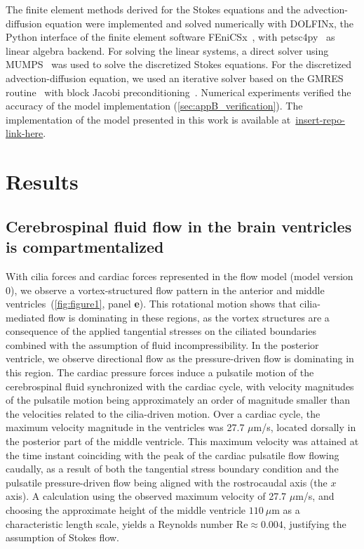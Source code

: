 \documentclass[fleqn]{wlscirep}
\begin{document}
The finite element methods derived for the Stokes equations and the advection-diffusion equation were implemented and solved numerically with DOLFINx, the Python interface of the finite element software FEniCSx~\cite{TheFEniCSProject2024FEniCSxDocumentation}, with petsc4py~\cite{Dalcin2011ParallelPython} as linear algebra backend. For solving the linear systems, a direct solver using MUMPS~\cite{Amestoy2011Mumps} was used to solve the discretized Stokes equations. For the discretized advection-diffusion equation, we used an iterative solver based on the GMRES routine~\cite{Saad1986GMRES:Systems} with block Jacobi preconditioning~\cite{Jacobi1845UeberGleichungen}. Numerical experiments verified the accuracy of the model implementation (\cref{sec:appB_verification}). The implementation of the model presented in this work is available at~\url{insert-repo-link-here}. 


\section*{Results}\label{sec:results}
\subsection*{Cerebrospinal fluid flow in the brain ventricles is compartmentalized}
With cilia forces and cardiac forces represented in the flow model (model version 0), we observe a vortex-structured flow pattern in the anterior and middle ventricles~(\cref{fig:figure1}, panel \textbf{e}). This rotational motion shows that cilia-mediated flow is dominating in these regions, as the vortex structures are a consequence of the applied tangential stresses on the ciliated boundaries combined with the assumption of fluid incompressibility. In the posterior ventricle, we observe directional flow as the pressure-driven flow is dominating in this region. The cardiac pressure forces induce a pulsatile motion of the cerebrospinal fluid synchronized with the cardiac cycle, with velocity magnitudes of the pulsatile motion being approximately an order of magnitude smaller than the velocities related to the cilia-driven motion. Over a cardiac cycle, the maximum velocity magnitude in the ventricles was 27.7 $\mu$m/s, located dorsally in the posterior part of the middle ventricle. This maximum velocity was attained at the time instant coinciding with the peak of the cardiac pulsatile flow flowing caudally, as a result of both the tangential stress boundary condition and the pulsatile pressure-driven flow being aligned with the rostrocaudal axis (the $x$ axis). A calculation using the observed maximum velocity of 27.7 $\mu$m/s, and choosing the approximate height of the middle ventricle $110 \ \mu$m as a characteristic length scale, yields a Reynolds number $\mathrm{Re} \approx 0.004$, justifying the assumption of Stokes flow.
\end{document}
